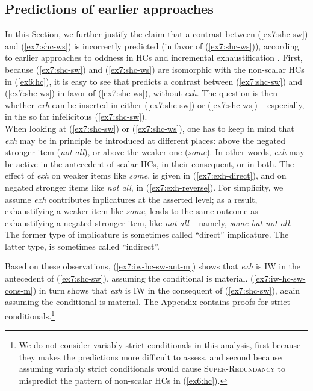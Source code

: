 \subsection{Predictions of earlier approaches}
In this Section, we further justify the claim that a contrast between (\ref{ex7:shc-sw}) and (\ref{ex7:shc-ws}) is incorrectly predicted (in favor of (\ref{ex7:shc-ws})), according to earlier approaches to oddness in HCs \parencite{Kalomoiros2024} and incremental exhaustification \parencite{Fox2018}. First, because (\ref{ex7:shc-sw}) and (\ref{ex7:shc-ws}) are isomorphic with the non-scalar HCs in (\ref{ex6:hc}), it is easy to see that \textcite{Kalomoiros2024} predicts a contrast between (\ref{ex7:shc-sw}) and (\ref{ex7:shc-ws}) in favor of (\ref{ex7:shc-ws}), without \textit{exh}. The question is then whether \textit{exh} can be inserted in either (\ref{ex7:shc-sw}) or (\ref{ex7:shc-ws}) -- especially, in the so far infelicitous (\ref{ex7:shc-sw}).\\

When looking at (\ref{ex7:shc-sw}) or (\ref{ex7:shc-ws}), one has to keep in mind that \textit{exh} may be in principle be introduced at different places: above the negated stronger item (\textit{not all}), or above the weaker one (\textit{some}). In other words, \textit{exh} may be active in the antecedent of scalar HCs, in their consequent, or in both. The effect of \textit{exh} on weaker items like \textit{some}, is given in (\ref{ex7:exh-direct}), and on negated stronger items like \textit{not all}, in (\ref{ex7:exh-reverse}). For simplicity, we assume \textit{exh} contributes inplicatures at the asserted level; as a result, exhaustifying a weaker item like \textit{some}, leads to the same outcome as exhaustifying a negated stronger item, like \textit{not all} -- namely, \textit{some but not all}. The former type of implicature is sometimes called ``direct'' implicature. The latter type, is sometimes called ``indirect''.

\begin{exe}
	\label{ex7:exh-direct}
	\label{ex7:exh-reverse}
\end{exe}

Based on these observations, (\ref{ex7:iw-hc-sw-ant-m}) shows that \textit{exh} is IW in the antecedent of (\ref{ex7:shc-sw}), assuming the conditional is material. (\ref{ex7:iw-hc-sw-cons-m}) in turn shows that \textit{exh} is IW in the consequent of (\ref{ex7:shc-sw}), again assuming the conditional is material. The Appendix contains proofs for strict conditionals.\footnote{We do not consider variably strict conditionals in this analysis, first because they makes the predictions more difficult to assess, and second because assuming variably strict conditionals would cause \textsc{Super-Redundancy} to mispredict the pattern of non-scalar HCs in (\ref{ex6:hc}).}

